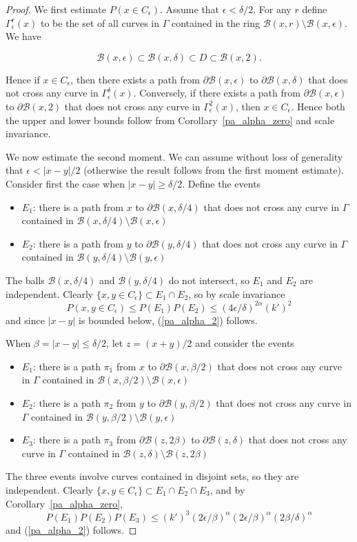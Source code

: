 \documentclass[11pt]{article}
\newcommand{\eps}{\epsilon}
\newcommand{\PP}{{ P}}
\newcommand{\cir}{\partial \B}
\newcommand{\B}{{\mathcal B}}
\begin{document}
\begin{proof}

We first estimate $\PP ( x \in C_\eps)$.
Assume that $\eps < \delta / 2$. 
For any $r$ define $\Gamma_\eps^r (x)$ to be the set of all curves in $\Gamma$
contained in the ring $\B(x,r) \setminus \B(x, \eps)$. We have

$$ \B(x, \eps) \subset \B(x,\delta) \subset D \subset \B(x,2). $$

Hence if $x \in C_\eps$, then there exists a path from $\cir(x,\eps)$ to 
$\cir(x,\delta)$
that does not cross any curve in $\Gamma_\eps^\delta(x)$. Conversely,
if there exists a path from $\cir(x,\eps)$ 
to $\cir (x,2)$ that does not cross any
curve in $\Gamma_\eps^2 (x)$, then $x \in C_\eps$.
Hence both the upper and lower bounds follow from 
 Corollary~\ref{pa_alpha_zero} and scale invariance.

We now estimate the second moment. 
We can assume without loss of generality that $\eps < |x-y|/2$
(otherwise the result follows from the first moment estimate).
Consider first the case when $|x-y| \ge \delta / 2$. Define the events
\begin{itemize}
\item $E_1$: there is a path from $x$ to $\cir(x,\delta/4)$ that does not
cross any curve in $\Gamma$ contained in $\B(x,\delta/4) \setminus \B(x,\eps)$
\item $E_2$: there is a path from $y$ to $\cir(y,\delta/4)$ that does not
cross any curve in $\Gamma$ contained in $\B(y,\delta/4) \setminus \B(y,\eps)$
\end{itemize}
The balls $\B(x,\delta/4)$ and $\B(y,\delta/4)$ do not intersect, 
so $E_1$ and $E_2$ are independent. Clearly 
$\{x, y \in C_\eps\} \subset E_1 \cap E_2$,
so by scale invariance
\begin{equation}
\PP(x, y \in C_\eps) \le \PP(E_1)\PP(E_2) \le 
(4\eps/\delta)^{2\alpha} (k')^2
\end{equation}
and since $|x-y|$ is bounded below, (\ref{pa_alpha_2}) follows.

When $\beta = |x-y| \le \delta / 2$, let $z = (x+y) / 2$
and consider the events 
\begin{itemize}
\item $E_1$: there is a path $\pi_1$ from $x$ to $\cir(x,\beta/2)$ that does not
cross any curve in $\Gamma$ contained in $\B(x,\beta/2) \setminus \B(x,\eps)$
\item $E_2$: there is a path $\pi_2$ from $y$ to $\cir(y,\beta/2)$ that does not
cross any curve in $\Gamma$ contained in $\B(y,\beta/2) \setminus \B(y,\eps)$
\item $E_3$: there is a path $\pi_3$ from $\cir(z,2 \beta )$ to $\cir(z,\delta)$ 
that does not cross any curve in $\Gamma$ contained in $\B(z,\delta) \setminus \B(z,2 \beta)$
\end{itemize}
The three events involve curves contained in disjoint sets,
so they are independent. Clearly $\{x, y \in C_\eps \} 
\subset E_1 \cap E_2 \cap E_3$, and by Corollary~\ref{pa_alpha_zero},
$$ \PP(E_1) \PP(E_2) \PP(E_3) \le (k')^3 (2\eps / \beta)^\alpha 
(2\eps / \beta)^\alpha (2\beta / \delta)^\alpha $$
and (\ref{pa_alpha_2}) follows.


\end{proof}
\end{document}

